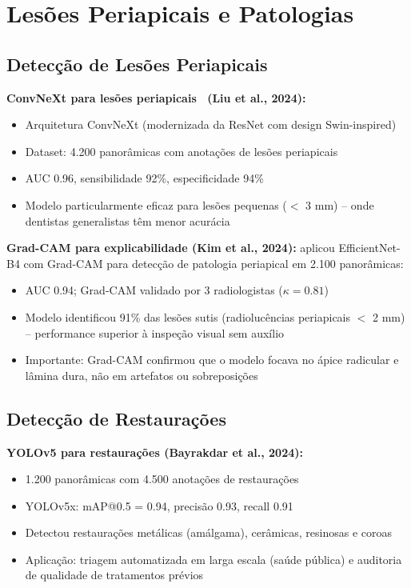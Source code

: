 \section{Lesões Periapicais e Patologias}
\label{sec:lesoes-periapicais}

\subsection{Detecção de Lesões Periapicais}

\textbf{ConvNeXt para lesões periapicais~\cite{liu2024convnext} (Liu et al., 2024):}
\begin{itemize}
  \item Arquitetura ConvNeXt (modernizada da ResNet com design Swin-inspired)
  \item Dataset: 4.200 panorâmicas com anotações de lesões periapicais
  \item AUC 0.96, sensibilidade 92\%, especificidade 94\%
  \item Modelo particularmente eficaz para lesões pequenas ($<$ 3 mm) -- onde
        dentistas generalistas têm menor acurácia
\end{itemize}

\textbf{Grad-CAM para explicabilidade (Kim et al., 2024):}
 aplicou EfficientNet-B4 com Grad-CAM para detecção de
patologia periapical em 2.100 panorâmicas:
\begin{itemize}
  \item AUC 0.94; Grad-CAM validado por 3 radiologistas ($\kappa = 0.81$)
  \item Modelo identificou 91\% das lesões sutis (radiolucências periapicais
        $<$ 2 mm) -- performance superior à inspeção visual sem auxílio
  \item Importante: Grad-CAM confirmou que o modelo focava no ápice radicular
        e lâmina dura, não em artefatos ou sobreposições
\end{itemize}

\subsection{Detecção de Restaurações}

\textbf{YOLOv5 para restaurações (Bayrakdar et al., 2024):} 
\begin{itemize}
  \item 1.200 panorâmicas com 4.500 anotações de restaurações
  \item YOLOv5x: mAP@0.5 = 0.94, precisão 0.93, recall 0.91
  \item Detectou restaurações metálicas (amálgama), cerâmicas, resinosas e coroas
  \item Aplicação: triagem automatizada em larga escala (saúde pública) e
        auditoria de qualidade de tratamentos prévios
\end{itemize}

